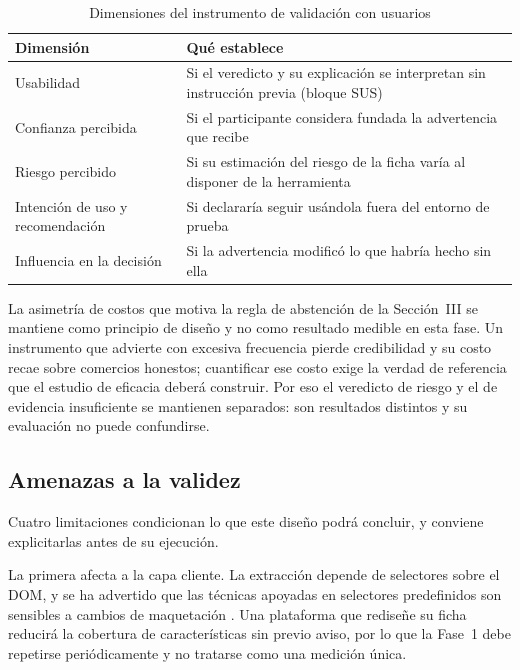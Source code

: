 \begin{table}[t]
\caption{Dimensiones del instrumento de validación con usuarios}
\label{tab:instrumento}
\centering
\footnotesize
\setlength{\tabcolsep}{3.5pt}
\renewcommand{\arraystretch}{1.15}
\begin{tabular}{@{}p{2.35cm}p{5.3cm}@{}}
\toprule
\textbf{Dimensión} & \textbf{Qué establece} \\
\midrule
Usabilidad & Si el veredicto y su explicación se interpretan sin instrucción previa (bloque SUS) \\
Confianza percibida & Si el participante considera fundada la advertencia que recibe \\
Riesgo percibido & Si su estimación del riesgo de la ficha varía al disponer de la herramienta \\
Intención de uso y recomendación & Si declararía seguir usándola fuera del entorno de prueba \\
Influencia en la decisión & Si la advertencia modificó lo que habría hecho sin ella \\
\bottomrule
\end{tabular}
\end{table}

La asimetría de costos que motiva la regla de abstención de la Sección~III se mantiene como
principio de diseño y no como resultado medible en esta fase. Un instrumento que advierte con
excesiva frecuencia pierde credibilidad y su costo recae sobre comercios honestos; cuantificar
ese costo exige la verdad de referencia que el estudio de eficacia deberá construir. Por eso
el veredicto de riesgo y el de evidencia insuficiente se mantienen separados: son resultados
distintos y su evaluación no puede confundirse.

\subsection{Amenazas a la validez}

Cuatro limitaciones condicionan lo que este diseño podrá concluir, y conviene explicitarlas
antes de su ejecución.

La primera afecta a la capa cliente. La extracción depende de selectores sobre el DOM, y se
ha advertido que las técnicas apoyadas en selectores predefinidos son sensibles a cambios de
maquetación \cite{ref24}. Una plataforma que rediseñe su ficha reducirá la cobertura de
características sin previo aviso, por lo que la Fase~1 debe repetirse periódicamente y no
tratarse como una medición única.


